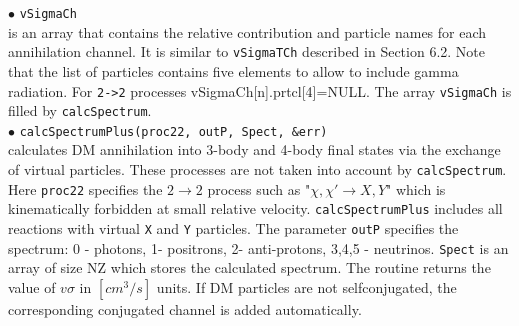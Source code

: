 \documentclass[12pt,a4paper]{article}
\begin{document}
\noindent
$\bullet$ \verb|vSigmaCh| \\
is an array that contains the relative contribution and particle names for each
annihilation channel. It is similar to  {\tt vSigmaTCh}
described in Section 6.2. Note that   the list of particles contains five elements to allow to include  gamma radiation. For \verb|2->2| processes vSigmaCh[n].prtcl[4]=NULL. The array {\tt vSigmaCh} is filled by 
{\tt calcSpectrum}. \\

\noindent
$\bullet$ \verb|calcSpectrumPlus(proc22, outP, Spect, &err)|  \\
calculates  DM annihilation  into 3-body and 4-body final states via the exchange of virtual particles. These processes are not taken into account by {\tt calcSpectrum}. 
Here {\tt proc22} specifies the   $2\to2$ process such as  "$\chi,\chi'\to X,Y$" which is kinematically forbidden at small relative velocity. 
{\tt calcSpectrumPlus} includes all  reactions with virtual {\tt X} and {\tt Y} particles. The parameter {\tt outP} specifies the 
spectrum: 0 - photons, 1- positrons, 2- anti-protons, 3,4,5 - neutrinos. {\tt Spect} is an array of 
size NZ which stores the calculated spectrum. The routine returns the  value of  $v\sigma$ in $[cm^3/s]$ units. If DM particles are not selfconjugated, the corresponding conjugated channel  is added automatically.
\end{document}
